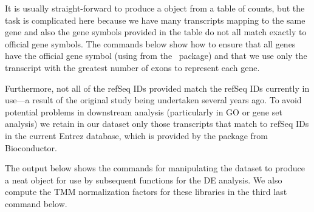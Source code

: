 It is usually straight-forward to produce a  object from
a table of counts, but the task is complicated here because we have
many transcripts mapping to the same gene and also the gene symbols
provided in the table do not all match exactly to official gene
symbols. The commands below show how to ensure that all genes have the
official gene symbol (using  from the \limma\
package) and that we use only the transcript with the greatest number
of exons to represent each gene.

Furthermore, not all of the refSeq IDs provided match the refSeq IDs
currently in use---a result of the original study being undertaken
several years ago. To avoid potential problems in downstream analysis
(particularly in GO or gene set analysis) we retain in our dataset
only those transcripts that match to refSeq IDs in the current Entrez
database, which is provided by the \code{org.HS.eg.db} package from
Bioconductor.

The output below shows the commands for manipulating the dataset to
produce a neat \code{DGEList} object for use by subsequent functions
for the DE analysis. We also compute the TMM normalization factors for
these libraries in the third last command below.


